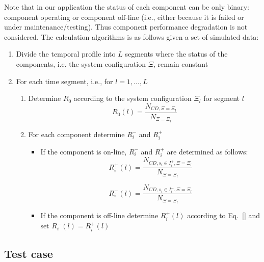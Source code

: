 Note that in our application the status of each component can be only binary: 
component operating or component off-line (i.e., either because it is failed or 
under maintenance/testing). Thus component performance degradation is not considered.
The calculation algorithms is as follows given a set of simulated data:
\begin{enumerate}
  \item Divide the temporal profile into $L$ segments where the status of the components,
        i.e. the system configuration $\Xi$, remain constant
  \item For each time segment, i.e., for $l=1,\ldots,L$ 
        \begin{enumerate}
          \item Determine $R_0$ according to the system configuration $\Xi_l$ for segment $l$
            \begin{equation}
              R_0(l) = \frac{N_{CD, \Xi=\Xi_l}}{N_{\Xi=\Xi_l}} 
              \label{eq:}
            \end{equation}
          \item For each component determine $R_i^-$ and $R_i^+$
          \begin{itemize}
            \item If the component is on-line, $R_i^-$ and $R_i^+$ are determined as follows:
              \begin{equation}
                R_i^+(l) = \frac{N_{CD, s_i \in I_i^+, \Xi=\Xi_l}}{N_{\Xi=\Xi_l}} 
                \label{eq:}
              \end{equation}
              
              \begin{equation}
                R_i^-(l) = \frac{N_{CD, s_i \in I_i^-, \Xi=\Xi_l}}{N_{\Xi=\Xi_l}} 
                \label{eq:}
              \end{equation}
            \item If the component is off-line determine $R_i^+(l)$ according to Eq.~\ref{} and 
                 set $R_i^-(l)=R_i^+(l)$
          \end{itemize}
        \end{enumerate}
\end{enumerate}

\subsection{Test case}
\label{sec:timeDepRIMsExample}

